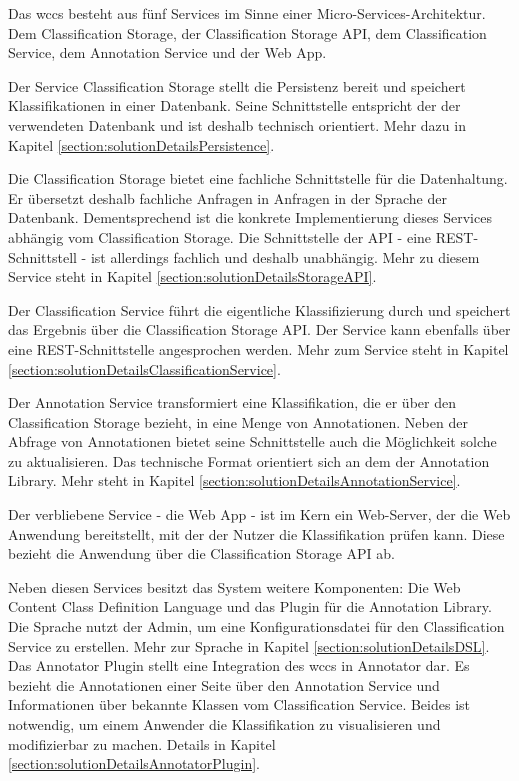         Das \gls{wccs} besteht aus fünf Services im Sinne einer Micro-Services-Architektur.
        Dem Classification Storage, der Classification Storage API, dem Classification Service, dem
        Annotation Service und der Web App.

        Der Service Classification Storage stellt die Persistenz bereit und speichert
        Klassifikationen in einer Datenbank.
        Seine Schnittstelle entspricht der der verwendeten Datenbank und ist deshalb
        technisch orientiert.
        Mehr dazu in Kapitel \ref{section:solutionDetailsPersistence}.

        Die Classification Storage bietet eine fachliche Schnittstelle für die Datenhaltung.
        Er übersetzt deshalb fachliche Anfragen in Anfragen in der Sprache der Datenbank.
        Dementsprechend ist die konkrete Implementierung dieses Services abhängig vom Classification Storage.
        Die Schnittstelle der API - eine REST-Schnittstell - ist allerdings fachlich und deshalb
        unabhängig. Mehr zu diesem Service steht in  Kapitel \ref{section:solutionDetailsStorageAPI}.

        Der Classification Service führt die eigentliche Klassifizierung durch
        und speichert das Ergebnis über die Classification Storage API.
        Der Service kann ebenfalls über eine REST-Schnittstelle angesprochen werden.
        Mehr zum Service steht in Kapitel \ref{section:solutionDetailsClassificationService}.

        Der Annotation Service transformiert eine Klassifikation,
        die er über den Classification Storage bezieht,
        in eine Menge von Annotationen.
        Neben der Abfrage von Annotationen bietet seine Schnittstelle auch
        die Möglichkeit solche zu aktualisieren.
        Das technische Format orientiert sich an dem der Annotation Library.
        Mehr steht in Kapitel \ref{section:solutionDetailsAnnotationService}.

        Der verbliebene Service - die Web App - ist im Kern ein Web-Server,
        der die Web Anwendung bereitstellt,
        mit der der Nutzer die Klassifikation prüfen kann.
        Diese bezieht die Anwendung über die Classification Storage API ab.

        Neben diesen Services besitzt das System weitere Komponenten:
        Die Web Content Class Definition Language und das Plugin für die
        Annotation Library.
        Die Sprache nutzt der Admin, um eine Konfigurationsdatei für den
        Classification Service zu erstellen.
        Mehr zur Sprache in Kapitel \ref{section:solutionDetailsDSL}.
        Das Annotator Plugin stellt eine Integration des \gls{wccs} in
        Annotator dar.
        Es bezieht die Annotationen einer Seite über den Annotation Service
        und Informationen über bekannte Klassen vom Classification Service.
        Beides ist notwendig, um einem Anwender die Klassifikation zu visualisieren
        und modifizierbar zu machen.
        Details in Kapitel \ref{section:solutionDetailsAnnotatorPlugin}.

